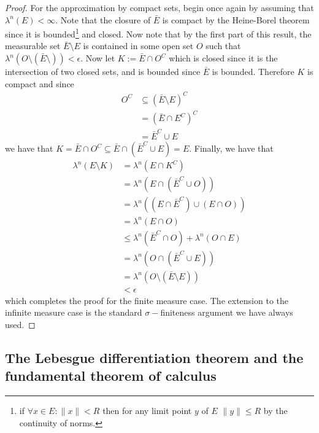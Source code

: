 \begin{proof}
For the approximation by compact sets, begin once again by assuming that $\lambda^n(E) < \infty$. Note that the closure of $\bar{E}$ is compact by the Heine-Borel theorem since it is bounded\footnote{if $\forall x \in E: \lVert x \rVert < R$ then for any limit point $y$ of $E$ $\lVert y \rVert \leq R$ by the continuity of norms.} and closed. Now note that by the first part of this result, the measurable set $\bar{E} \setminus E$ is contained in some open set $O$ such that $\lambda^n(O \setminus \left(\bar{E} \setminus  \right)) < \epsilon $. Now let $K := \bar{E} \cap O^C$ which is closed since it is the intersection of two closed sets, and is bounded since $\bar{E}$ is bounded. Therefore $K$ is compact and since
\begin{align*}
	O^C &\subseteq \left(\bar{E} \setminus E\right)^C \\
	&= \left(\bar{E} \cap E^C \right)^C \\
	&= \bar{E}^C \cup E
\end{align*}
we have that $K = \bar{E} \cap O^C \subseteq \bar{E} \cap \left(\bar{E}^C \cup E\right) = E$. Finally, we have that 
\begin{align*}
	\lambda^n\left(E \setminus K\right) &= \lambda^n\left(E \cap K^C\right) \\
	&= \lambda^n\left(E \cap \left(\bar{E}^C \cup O\right)\right) \\
	&= \lambda^n\left(\left(E \cap \bar{E}^C\right) \cup  \left( E \cap O \right)\right) \\
	&= \lambda^n \left(E \cap O\right) \\
	&\leq \lambda^n\left(\bar{E}^C \cap O\right) + \lambda^n\left(O \cap E\right) \\
	&=\lambda^n\left(O \cap \left(\bar{E}^C \cup E\right)\right) \\
	&=\lambda^n \left(O \setminus \left(\bar{E}\setminus E\right)\right) \\
	&< \epsilon
\end{align*}
which completes the proof for the finite measure case. The extension to the infinite measure case is the standard $\sigma-$finiteness argument we have always used.

\end{proof}



\subsection{The Lebesgue differentiation theorem and the fundamental theorem
of calculus}

